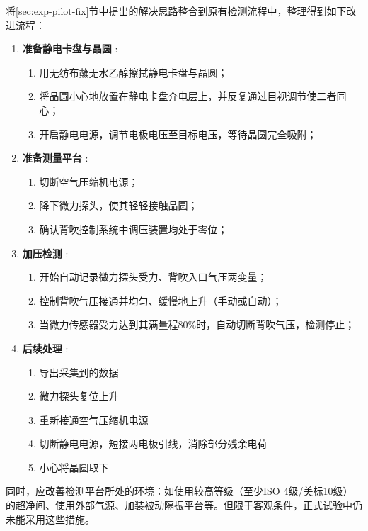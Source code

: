 将\ref{sec:exp-pilot-fix}节中提出的解决思路整合到原有检测流程中，整理得到如下改进流程：

\begin{enumerate}
  \item \textbf{准备静电卡盘与晶圆} :
  \begin{enumerate}
    \item 用无纺布蘸无水乙醇擦拭静电卡盘与晶圆；
    \item 将晶圆小心地放置在静电卡盘介电层上，并反复通过目视调节使二者同心；
    \item 开启静电电源，调节电极电压至目标电压，等待晶圆完全吸附；
  \end{enumerate}
  
  \item \textbf{准备测量平台} :
  \begin{enumerate}
    \item 切断空气压缩机电源；
    \item 降下微力探头，使其轻轻接触晶圆；
    \item 确认背吹控制系统中调压装置均处于零位；
  \end{enumerate}
  
  \item \textbf{加压检测} :
  \begin{enumerate}
    \item 开始自动记录微力探头受力、背吹入口气压两变量；
    \item 控制背吹气压接通并均匀、缓慢地上升（手动或自动）；
    \item 当微力传感器受力达到其满量程80\%时，自动切断背吹气压，检测停止；
  \end{enumerate}
  
  \item \textbf{后续处理} :
  \begin{enumerate}
    \item 导出采集到的数据
    \item 微力探头复位上升
    \item 重新接通空气压缩机电源
    \item 切断静电电源，短接两电极引线，消除部分残余电荷
    \item 小心将晶圆取下
  \end{enumerate}
\end{enumerate}

同时，应改善检测平台所处的环境：如使用较高等级（至少ISO 4级/美标10级）的超净间、使用外部气源、加装被动隔振平台等。但限于客观条件，正式试验中仍未能采用这些措施。


